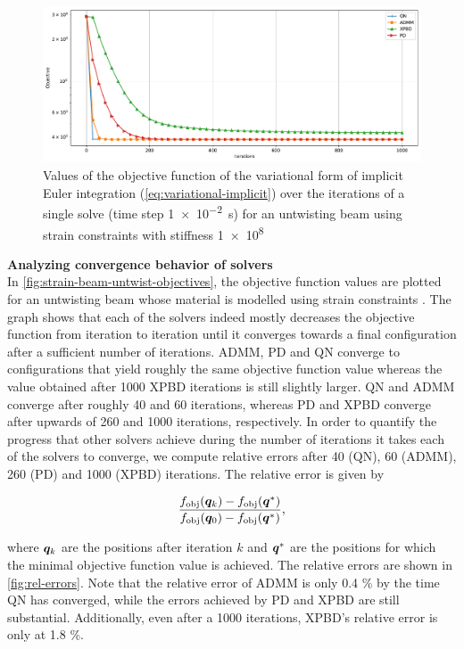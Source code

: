 \begin{figure}[h]
    \includegraphics[width=\textwidth]{figures/strain_beam_untwist_objectives.pdf}
    \caption{Values of the objective function of the variational form of implicit Euler integration (\cref{eq:variational-implicit}) over the iterations of a single solve (time step 
    \SI{1e-2}{\second}) for an untwisting beam using strain constraints with stiffness \num{1e8}}
    \label{fig:strain-beam-untwist-objectives}
\end{figure}

\noindent \textbf{Analyzing convergence behavior of solvers}\\ 
\noindent In \autoref{fig:strain-beam-untwist-objectives}, the objective function values are plotted for an untwisting beam whose material is modelled using strain constraints 
\cite{bouaziz2014}. The graph shows that each of the solvers indeed mostly decreases the objective function from iteration 
to iteration until it converges towards a final configuration after a sufficient number of iterations. ADMM, PD and QN converge to configurations that 
yield roughly the same objective function value whereas the value obtained after 1000 XPBD iterations is still slightly larger. QN and ADMM converge after roughly 40 
and 60 iterations, whereas PD and XPBD converge after upwards of 260 and 1000 iterations, respectively. In order to quantify the progress that other solvers
achieve during the number of iterations it takes each of the solvers to converge, we compute relative errors after 40 (QN), 60 (ADMM), 260 (PD) and 1000 (XPBD)
iterations. The relative error is given by 

\begin{equation}\label{eq:rel-error}
    \frac{f_{\text{obj}}(\bm{q}_k) - f_{\text{obj}}(\bm{q}^*)}{f_{\text{obj}}(\bm{q}_0) - f_{\text{obj}}(\bm{q}^*)},
\end{equation}

\noindent where $\bm{q}_k$ are the positions after iteration $k$ and $\bm{q}^*$ are the positions for which the minimal objective function value is achieved.
The relative errors are shown in \autoref{fig:rel-errors}. Note that the relative error of ADMM is only 0.4 \% by the time QN has converged, while the errors 
achieved by PD and XPBD are still substantial. Additionally, even after a 1000 iterations, XPBD's relative error is only at 1.8 \%.

